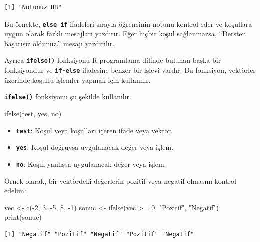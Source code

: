 \documentclass[
  letterpaper,
  DIV=11,
  numbers=noendperiod]{scrreprt}
\newenvironment{Shaded}{\begin{snugshade}}{\end{snugshade}}
\newcommand{\DecValTok}[1]{\textcolor[rgb]{0.68,0.00,0.00}{#1}}
\newcommand{\FunctionTok}[1]{\textcolor[rgb]{0.28,0.35,0.67}{#1}}
\newcommand{\NormalTok}[1]{\textcolor[rgb]{0.00,0.23,0.31}{#1}}
\newcommand{\OtherTok}[1]{\textcolor[rgb]{0.00,0.23,0.31}{#1}}
\newcommand{\SpecialCharTok}[1]{\textcolor[rgb]{0.37,0.37,0.37}{#1}}
\newcommand{\StringTok}[1]{\textcolor[rgb]{0.13,0.47,0.30}{#1}}
\begin{document}
\begin{verbatim}
[1] "Notunuz BB"
\end{verbatim}

Bu örnekte, \textbf{\texttt{else\ if}} ifadeleri sırayla öğrencinin
notunu kontrol eder ve koşullara uygun olarak farklı mesajları yazdırır.
Eğer hiçbir koşul sağlanmazsa, ``Dersten başarısız oldunuz.'' mesajı
yazdırılır.

Ayrıca \textbf{\texttt{ifelse()}} fonksiyonu R programlama dilinde
bulunan başka bir fonksiyondur ve \textbf{\texttt{if-else}} ifadesine
benzer bir işlevi vardır. Bu fonksiyon, vektörler üzerinde koşullu
işlemler yapmak için kullanılır.

\textbf{\texttt{ifelse()}} fonksiyonu şu şekilde kullanılır.

\begin{Shaded}
\begin{Highlighting}[]
\FunctionTok{ifelse}\NormalTok{(test, yes, no)}
\end{Highlighting}
\end{Shaded}

\begin{itemize}
\item
  \textbf{\texttt{test}}: Koşul veya koşulları içeren ifade veya vektör.
\item
  \textbf{\texttt{yes}}: Koşul doğruysa uygulanacak değer veya işlem.
\item
  \textbf{\texttt{no}}: Koşul yanlışsa uygulanacak değer veya işlem.
\end{itemize}

Örnek olarak, bir vektördeki değerlerin pozitif veya negatif olmasını
kontrol edelim:

\begin{Shaded}
\begin{Highlighting}[]
\NormalTok{vec }\OtherTok{\textless{}{-}} \FunctionTok{c}\NormalTok{(}\SpecialCharTok{{-}}\DecValTok{2}\NormalTok{, }\DecValTok{3}\NormalTok{, }\SpecialCharTok{{-}}\DecValTok{5}\NormalTok{, }\DecValTok{8}\NormalTok{, }\SpecialCharTok{{-}}\DecValTok{1}\NormalTok{)}
\NormalTok{sonuc }\OtherTok{\textless{}{-}} \FunctionTok{ifelse}\NormalTok{(vec }\SpecialCharTok{\textgreater{}=} \DecValTok{0}\NormalTok{, }\StringTok{"Pozitif"}\NormalTok{, }\StringTok{"Negatif"}\NormalTok{)}
\FunctionTok{print}\NormalTok{(sonuc)}
\end{Highlighting}
\end{Shaded}

\begin{verbatim}
[1] "Negatif" "Pozitif" "Negatif" "Pozitif" "Negatif"
\end{verbatim}
\end{document}

